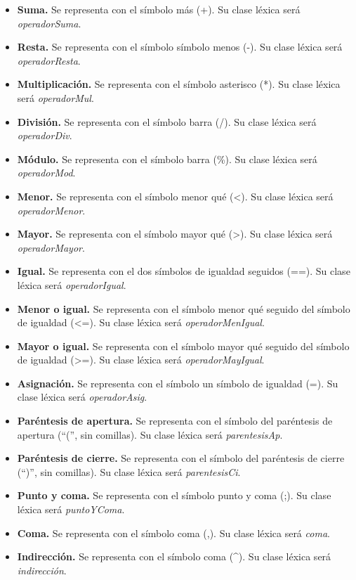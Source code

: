 \begin{itemize}
    \item \textbf{Suma.} Se representa con el símbolo más (+). Su clase léxica será \textit{operadorSuma}.
    \item \textbf{Resta.} Se representa con el símbolo símbolo menos (-). Su clase léxica será \textit{operadorResta}.
    \item \textbf{Multiplicación.} Se representa con el símbolo asterisco (*). Su clase léxica será \textit{operadorMul}.
    \item \textbf{División.} Se representa con el símbolo barra (/). Su clase léxica será \textit{operadorDiv}.
    \item \textbf{Módulo.} Se representa con el símbolo barra (\%). Su clase léxica será \textit{operadorMod}.
    \item \textbf{Menor.} Se representa con el símbolo menor qué (<). Su clase léxica será \textit{operadorMenor}.
    \item \textbf{Mayor.} Se representa con el símbolo mayor qué (>). Su clase léxica será \textit{operadorMayor}.
    \item \textbf{Igual.} Se representa con el dos símbolos de igualdad seguidos (==). Su clase léxica será \textit{operadorIgual}.
    \item \textbf{Menor o igual.} Se representa con el símbolo menor qué seguido del símbolo de igualdad (<=). Su clase léxica será \textit{operadorMenIgual}.
    \item \textbf{Mayor o igual.} Se representa con el símbolo mayor qué seguido del símbolo de igualdad (>=). Su clase léxica será \textit{operadorMayIgual}.
    \item \textbf{Asignación.} Se representa con el símbolo un símbolo de igualdad (=). Su clase léxica será \textit{operadorAsig}.
    \item \textbf{Paréntesis de apertura.} Se representa con el símbolo del paréntesis de apertura (``('', sin comillas). Su clase léxica será \textit{parentesisAp}.
    \item \textbf{Paréntesis de cierre.} Se representa con el símbolo del paréntesis de cierre (``)'', sin comillas). Su clase léxica será \textit{parentesisCi}.
    \item \textbf{Punto y coma.} Se representa con el símbolo punto y coma (;). Su clase léxica será \textit{puntoYComa}.
    \item \textbf{Coma.} Se representa con el símbolo coma (,). Su clase léxica será \textit{coma}.
    \item \textbf{Indirección.} Se representa con el símbolo coma (^). Su clase léxica será \textit{indirección}.

\end{itemize}

